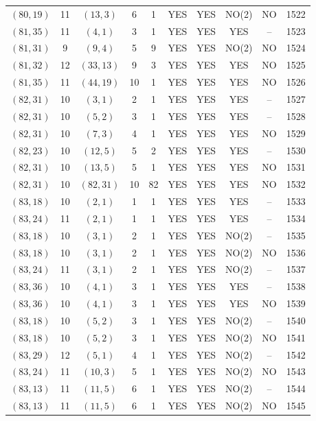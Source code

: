 \begin{longtable}{|c|c|c|c|c|c|c|c|c|c|}
$(80, 19)$ & 11 & $(13, 3)$ & 6 & 1 & YES & YES & NO(2) & NO & 1522\\
$(81, 35)$ & 11 & $(4, 1)$ & 3 & 1 & YES & YES & YES & -- & 1523\\
$(81, 31)$ & 9 & $(9, 4)$ & 5 & 9 & YES & YES & NO(2) & NO & 1524\\
$(81, 32)$ & 12 & $(33, 13)$ & 9 & 3 & YES & YES & YES & NO & 1525\\
$(81, 35)$ & 11 & $(44, 19)$ & 10 & 1 & YES & YES & YES & NO & 1526\\
$(82, 31)$ & 10 & $(3, 1)$ & 2 & 1 & YES & YES & YES & -- & 1527\\
$(82, 31)$ & 10 & $(5, 2)$ & 3 & 1 & YES & YES & YES & -- & 1528\\
$(82, 31)$ & 10 & $(7, 3)$ & 4 & 1 & YES & YES & YES & NO & 1529\\
$(82, 23)$ & 10 & $(12, 5)$ & 5 & 2 & YES & YES & YES & -- & 1530\\
$(82, 31)$ & 10 & $(13, 5)$ & 5 & 1 & YES & YES & YES & NO & 1531\\
$(82, 31)$ & 10 & $(82, 31)$ & 10 & 82 & YES & YES & YES & NO & 1532\\
$(83, 18)$ & 10 & $(2, 1)$ & 1 & 1 & YES & YES & YES & -- & 1533\\
$(83, 24)$ & 11 & $(2, 1)$ & 1 & 1 & YES & YES & YES & -- & 1534\\
$(83, 18)$ & 10 & $(3, 1)$ & 2 & 1 & YES & YES & NO(2) & -- & 1535\\
$(83, 18)$ & 10 & $(3, 1)$ & 2 & 1 & YES & YES & NO(2) & NO & 1536\\
$(83, 24)$ & 11 & $(3, 1)$ & 2 & 1 & YES & YES & NO(2) & -- & 1537\\
$(83, 36)$ & 10 & $(4, 1)$ & 3 & 1 & YES & YES & YES & -- & 1538\\
$(83, 36)$ & 10 & $(4, 1)$ & 3 & 1 & YES & YES & YES & NO & 1539\\
$(83, 18)$ & 10 & $(5, 2)$ & 3 & 1 & YES & YES & NO(2) & -- & 1540\\
$(83, 18)$ & 10 & $(5, 2)$ & 3 & 1 & YES & YES & NO(2) & NO & 1541\\
$(83, 29)$ & 12 & $(5, 1)$ & 4 & 1 & YES & YES & NO(2) & -- & 1542\\
$(83, 24)$ & 11 & $(10, 3)$ & 5 & 1 & YES & YES & NO(2) & NO & 1543\\
$(83, 13)$ & 11 & $(11, 5)$ & 6 & 1 & YES & YES & NO(2) & -- & 1544\\
$(83, 13)$ & 11 & $(11, 5)$ & 6 & 1 & YES & YES & NO(2) & NO & 1545\\

\end{longtable}
